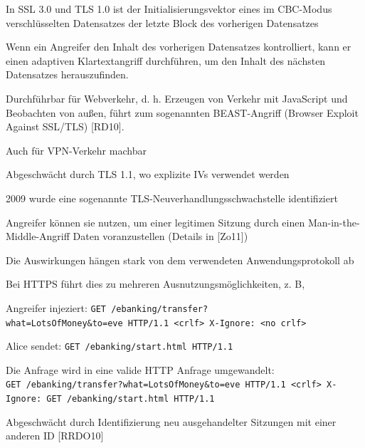 \documentclass[a4paper]{article}
\begin{document}
\begin{multicols}{3}
\begin{itemize*}
\begin{itemize*}
                  \begin{itemize*}
                        \item In SSL 3.0 und TLS 1.0 ist der Initialisierungsvektor eines im CBC-Modus verschlüsselten Datensatzes der letzte Block des vorherigen Datensatzes
                        \item Wenn ein Angreifer den Inhalt des vorherigen Datensatzes kontrolliert, kann er einen adaptiven Klartextangriff durchführen, um den Inhalt des nächsten Datensatzes herauszufinden.
                        \item Durchführbar für Webverkehr, d. h. Erzeugen von Verkehr mit JavaScript und Beobachten von außen, führt zum sogenannten BEAST-Angriff (Browser Exploit Against SSL/TLS) {[}RD10{]}.
                        \item Auch für VPN-Verkehr machbar
                        \item Abgeschwächt durch TLS 1.1, wo explizite IVs verwendet werden
                        \item 2009 wurde eine sogenannte TLS-Neuverhandlungsschwachstelle identifiziert
                        \begin{itemize*} \item Angreifer können sie nutzen, um einer legitimen Sitzung durch einen Man-in-the-Middle-Angriff Daten voranzustellen (Details in {[}Zo11{]}) \item Die Auswirkungen hängen stark von dem verwendeten Anwendungsprotokoll ab \end{itemize*}
                        \item Bei HTTPS führt dies zu mehreren Ausnutzungsmöglichkeiten, z. B,
                        \begin{itemize*} \item Angreifer injeziert: \texttt{GET\ /ebanking/transfer?what=LotsOfMoney\&to=eve\ HTTP/1.1\ \textless{}crlf\textgreater{}\ X-Ignore:\ \textless{}no\ crlf\textgreater{}} \item Alice sendet: \texttt{GET\ /ebanking/start.html\ HTTP/1.1} \item Die Anfrage wird in eine valide HTTP Anfrage umgewandelt: \texttt{GET\ /ebanking/transfer?what=LotsOfMoney\&to=eve\ HTTP/1.1\ \textless{}crlf\textgreater{}\ X-Ignore:\ GET\ /ebanking/start.html\ HTTP/1.1} \end{itemize*}
                        \item Abgeschwächt durch Identifizierung neu ausgehandelter Sitzungen mit einer anderen ID {[}RRDO10{]}
                  \end{itemize*}
            \end{itemize*}



\end{itemize*}
\end{multicols}
\end{document}
